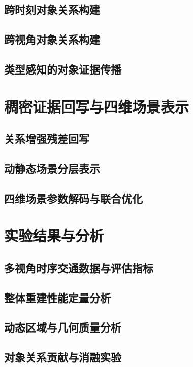 \subsection{跨时刻对象关系构建}

\subsection{跨视角对象关系构建}

\subsection{类型感知的对象证据传播}

\section{稠密证据回写与四维场景表示}

\subsection{关系增强残差回写}

\subsection{动静态场景分层表示}

\subsection{四维场景参数解码与联合优化}

\section{实验结果与分析}

\subsection{多视角时序交通数据与评估指标}

\subsection{整体重建性能定量分析}

\subsection{动态区域与几何质量分析}

\subsection{对象关系贡献与消融实验}

